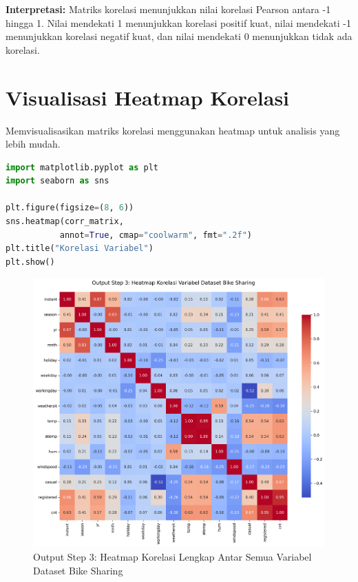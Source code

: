 \documentclass[11pt,a4paper]{article}
\begin{document}
    \begin{tcolorbox}
        \textbf{Interpretasi:} Matriks korelasi menunjukkan nilai korelasi Pearson antara -1 hingga 1.
        \hspace{1cm}Nilai mendekati 1 menunjukkan korelasi positif kuat, nilai mendekati -1 menunjukkan korelasi negatif kuat, dan nilai mendekati 0 menunjukkan tidak ada korelasi.
    \end{tcolorbox}


    \section{Visualisasi Heatmap Korelasi}
    Memvisualisasikan matriks korelasi menggunakan heatmap untuk analisis yang lebih mudah.
    \begin{lstlisting}[language=Python]
import matplotlib.pyplot as plt
import seaborn as sns

plt.figure(figsize=(8, 6))
sns.heatmap(corr_matrix,
           annot=True, cmap="coolwarm", fmt=".2f")
plt.title("Korelasi Variabel")
plt.show()
    \end{lstlisting}

    \begin{figure}[h]
        \centering
        \includegraphics[width=1.0\textwidth]{./OUTPUT/step3_heatmap.png}
        \caption{Output Step 3: Heatmap Korelasi Lengkap Antar Semua Variabel Dataset Bike Sharing}
        \label{fig:heatmap_full}
    \end{figure}
\end{document}
